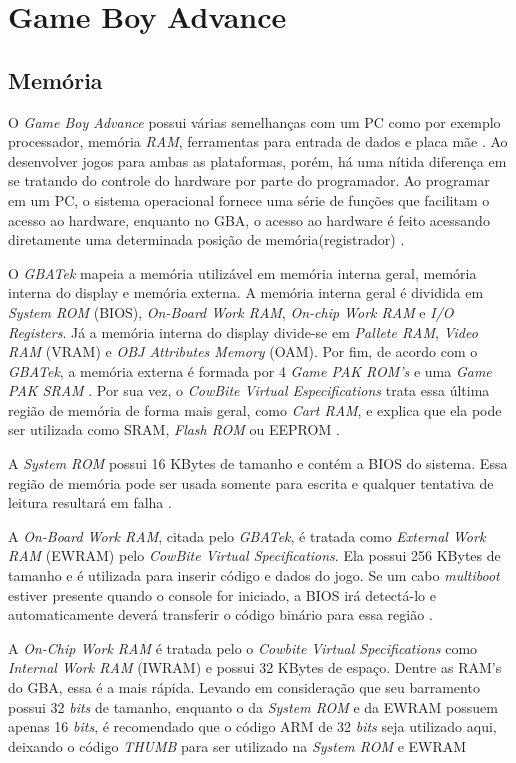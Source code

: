 \section{Game Boy Advance}

\subsection{Memória}

O \textit{Game Boy Advance} possui várias semelhanças com um PC como por exemplo processador, memória \textit{RAM}, ferramentas para entrada de dados e placa mãe \cite{harbour}. Ao desenvolver jogos para ambas as plataformas, porém, há uma nítida diferença em se tratando do controle do hardware por parte do programador. Ao programar em um PC, o sistema operacional fornece uma série de funções que facilitam o acesso ao hardware, enquanto no GBA, o acesso ao hardware é feito acessando diretamente uma determinada posição de memória(registrador) \cite{harbour}.

O \textit{GBATek} mapeia a memória utilizável em memória interna geral, memória interna do display e memória externa. A memória interna geral é dividida em \textit{System ROM} (BIOS), \textit{On-Board Work RAM}, \textit{On-chip Work RAM} e \textit{I/O Registers}. Já a memória interna do display divide-se em \textit{Pallete RAM}, \textit{Video RAM} (VRAM) e \textit{OBJ Attributes Memory} (OAM). Por fim, de acordo com o \textit{GBATek}, a memória externa é formada por 4 \textit{Game PAK ROM's} e uma \textit{Game PAK SRAM} \cite{harbour}. Por sua vez, o \textit{CowBite Virtual Especifications} trata essa última região de memória de forma mais geral, como \textit{Cart RAM}, e explica que ela pode ser utilizada como SRAM, \textit{Flash ROM} ou EEPROM \cite{cowbite}.

A \textit{System ROM} possui 16 KBytes de tamanho e contém a BIOS do sistema. Essa região de memória pode ser usada somente para escrita e qualquer tentativa de leitura resultará em falha \cite{cowbite}.

A \textit{On-Board Work RAM}, citada pelo \textit{GBATek}, é tratada como \textit{External Work RAM} (EWRAM) pelo \textit{CowBite Virtual Specifications}. Ela possui 256 KBytes de tamanho e é utilizada para inserir código e dados do jogo. Se um cabo \textit{multiboot} estiver presente quando o console for iniciado, a BIOS irá detectá-lo e automaticamente deverá transferir o código binário para essa região \cite{cowbite}. 

A \textit{On-Chip Work RAM} é tratada pelo o \textit{Cowbite Virtual Specifications} como \textit{Internal Work RAM} (IWRAM) e possui 32 KBytes de espaço. Dentre as RAM's do GBA, essa é a mais rápida. Levando em consideração que seu barramento possui 32 \textit{bits} de tamanho, enquanto o da \textit{System ROM} e da EWRAM possuem apenas 16 \textit{bits}, é recomendado que o código ARM de 32 \textit{bits} seja utilizado aqui, deixando o código \textit{THUMB} para ser utilizado na \textit{System ROM} e EWRAM \cite{cowbite}

